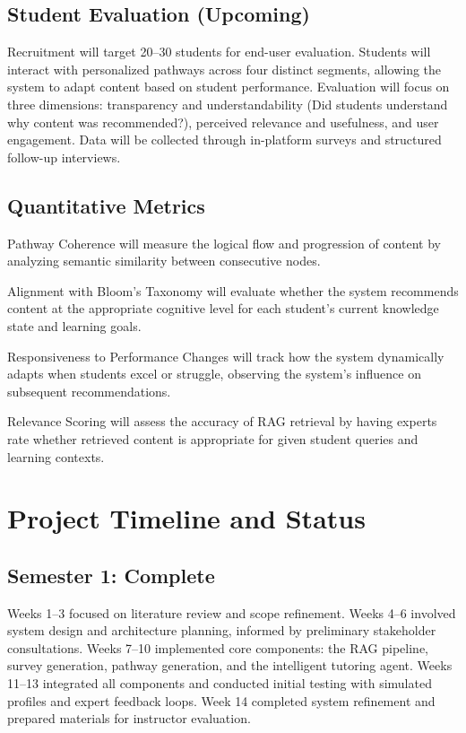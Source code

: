 \documentclass{stylefiles/capstone}
\begin{document}
\subsection{Student Evaluation (Upcoming)}

Recruitment will target 20--30 students for end-user evaluation. Students will interact with personalized pathways across four distinct segments, allowing the system to adapt content based on student performance. Evaluation will focus on three dimensions: transparency and understandability (Did students understand why content was recommended?), perceived relevance and usefulness, and user engagement. Data will be collected through in-platform surveys and structured follow-up interviews.

\subsection{Quantitative Metrics}

Pathway Coherence will measure the logical flow and progression of content by analyzing semantic similarity between consecutive nodes.

Alignment with Bloom's Taxonomy will evaluate whether the system recommends content at the appropriate cognitive level for each student's current knowledge state and learning goals.

Responsiveness to Performance Changes will track how the system dynamically adapts when students excel or struggle, observing the system's influence on subsequent recommendations.

Relevance Scoring will assess the accuracy of RAG retrieval by having experts rate whether retrieved content is appropriate for given student queries and learning contexts.

\section{Project Timeline and Status}

\subsection*{Semester 1: Complete}

Weeks 1--3 focused on literature review and scope refinement. Weeks 4--6 involved system design and architecture planning, informed by preliminary stakeholder consultations. Weeks 7--10 implemented core components: the RAG pipeline, survey generation, pathway generation, and the intelligent tutoring agent. Weeks 11--13 integrated all components and conducted initial testing with simulated profiles and expert feedback loops. Week 14 completed system refinement and prepared materials for instructor evaluation.
\end{document}
